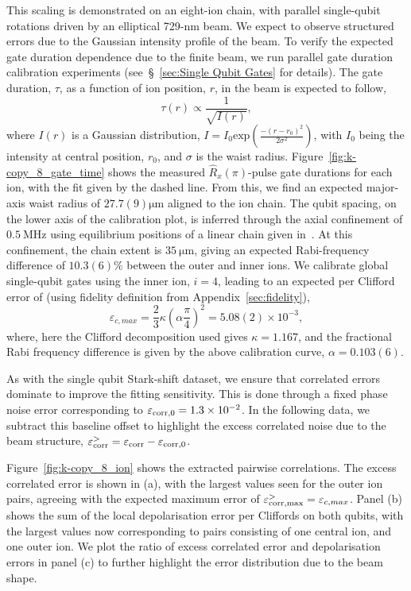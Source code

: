 This scaling is demonstrated on an eight-ion chain, with parallel single-qubit
rotations driven by an elliptical 729-nm beam. We expect to
observe structured errors due to the Gaussian intensity profile of the beam. To
verify the expected gate duration dependence due to the finite beam, we run
parallel gate duration calibration experiments (see~\S~\ref{sec:Single
Qubit Gates} for details). The gate duration, $\tau$, as a function of ion position, $r$, in the beam is expected to follow,
\begin{equation}
    \label{eqn:beam_waist}
\tau(r)\propto\frac{1}{\sqrt{I(r)}},
\end{equation}
where $I(r)$ is a Gaussian distribution, $I=I_0 \mathrm{exp}\left(\frac{-(r-r_0)^2}{2\sigma^2}\right)$, with $I_0$ being the intensity at central position, $r_0$, and $\sigma$ is the waist radius. Figure~\ref{fig:k-copy_8_gate_time} shows the measured $\hat R_x(\pi)$-pulse gate durations for each ion, with the fit given by the dashed line. From this, we find an expected
major-axis waist radius of $27.7(9)\unit{\micro\meter}$ aligned to the ion
chain. The qubit spacing, on the lower axis of the calibration plot, is inferred through the axial confinement of $0.5~\unit{\mega\hertz}$ using equilibrium positions of a linear chain given in~\cite{james_quantum_1998}.
At this confinement, the chain extent is
$35~\unit{\micro\meter}$, giving an expected Rabi-frequency difference of
$10.3(6)\%$ between the outer and inner ions.
We calibrate global single-qubit gates using
the inner ion, $i=4$, leading to an expected per Clifford error of (using fidelity definition from Appendix~\ref{sec:fidelity}),
\begin{equation}
\varepsilon_{c,max} = \frac{2}{3}\kappa \left(\alpha\frac{\pi}{4}\right)^2=5.08(2)\times10^{-3},
\end{equation}
where, here the Clifford decomposition used gives $\kappa=1.167$, and the fractional Rabi frequency difference is given by the above calibration curve, $\alpha=0.103(6)$.

As with the single qubit Stark-shift dataset, we ensure that correlated errors dominate to improve the fitting sensitivity. This is done through a fixed phase noise error corresponding to $\varepsilon_{\rm corr,0} = 1.3\times10^{-2}$. In the following data, we subtract this baseline offset to highlight the excess correlated noise due to the beam structure, $\varepsilon_{\rm corr}^>=\varepsilon_{\rm corr}-\varepsilon_{\rm corr,0}$.

Figure~\ref{fig:k-copy_8_ion} shows the 
extracted pairwise correlations. The excess correlated error is shown in (a), with the largest values seen for the outer ion pairs, agreeing with the expected maximum error of $\varepsilon_{\rm corr, max}^>=\varepsilon_{c, max}$. Panel (b) shows the sum of the local depolarisation error per Cliffords on both qubits, with the largest values now corresponding to pairs consisting of one central ion, and one outer ion. We plot the ratio of excess correlated error and depolarisation errors in panel (c) to further highlight the error distribution due to the beam shape.
